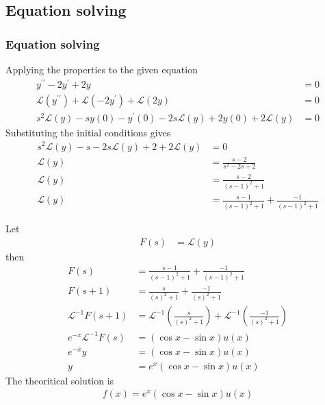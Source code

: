 \documentclass{beamer}
\providecommand{\brak}[1]{\ensuremath{\left(#1\right)}}
\theoremstyle{remark}
\numberwithin{equation}{section}
\begin{document}
\subsection{Equation solving}
\begin{frame}
\frametitle{Equation solving}
Applying the properties to the given equation
\begin{align}
	y^{\prime\prime} -2y^{\prime} +2y &= 0\\
	\mathcal{L}\brak{y^{\prime\prime}} + \mathcal{L}\brak{-2y^\prime}+\mathcal{L}\brak{2y} &= 0\\
	s^2\mathcal{L}\brak{y} -sy\brak{0}-y^\prime\brak{0}-2s\mathcal{L}\brak{y}+2y\brak{0}+2\mathcal{L}\brak{y} &= 0
\end{align}
Substituting the initial conditions gives
\begin{align}
	s^2\mathcal{L}\brak{y} -s-2s\mathcal{L}\brak{y}+2+2\mathcal{L}\brak{y} &= 0\\
	\mathcal{L}\brak{y} &= \frac{s-2}{s^2-2s+2}\\
	\mathcal{L}\brak{y} &= \frac{s-2}{\brak{s-1}^2+1}\\
	\mathcal{L}\brak{y} &= \frac{s-1}{\brak{s-1}^2+1} + \frac{-1}{\brak{s-1}^2+1}
\end{align}
\end{frame}
\begin{frame}
Let
\begin{align}
	F\brak{s} &= \mathcal{L}\brak{y}
\end{align}
then
\begin{align}
	F\brak{s} &= \frac{s-1}{\brak{s-1}^2+1} + \frac{-1}{\brak{s-1}^2+1}\\
	F\brak{s+1} &= \frac{s}{\brak{s}^2+1} + \frac{-1}{\brak{s}^2+1}\\
	\mathcal{L}^{-1}F\brak{s+1} &= \mathcal{L}^{-1}\brak{\frac{s}{\brak{s}^2+1}} + \mathcal{L}^{-1}\brak{\frac{-1}{\brak{s}^2+1}}\\
	e^{-x}\mathcal{L}^{-1}F\brak{s} &= \brak{\cos{x} - \sin{x}}u\brak{x}\\
	e^{-x}y &= \brak{\cos{x} - \sin{x}}u\brak{x}\\
	y &= e^{x}\brak{\cos{x}-\sin{x}}u\brak{x}
\end{align}
The theoritical solution is 
\begin{align}
	f\brak{x} = e^{x}\brak{\cos{x}-\sin{x}}u\brak{x}
\end{align}
\end{frame}
\end{document}
